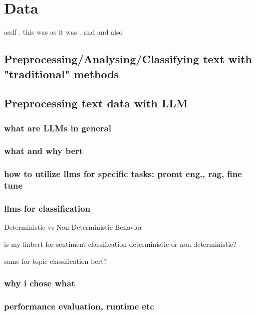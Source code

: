 \chapter{Data}\label{sec2}
\thispagestyle{empty}

asdf \cite{cathcart2020}. this was as it was \citep{cathcart2020}. and \cite{bieri2023} and also \cite{nopp2015}

\section{Preprocessing/Analysing/Classifying text with "traditional" methods}

\section{Preprocessing text data with LLM}

\subsection{what are LLMs in general}

\subsection{what and why bert}

\subsection{how to utilize llms for specific tasks: promt eng., rag, fine tune}

\subsection{llms for classification}

Deterministic vs Non-Deterministic Behavior

is my finbert for sentiment classification deterministic or non deterministic?

same for topic classification bert?

\subsection{why i chose what}

\subsection{performance evaluation, runtime etc}

